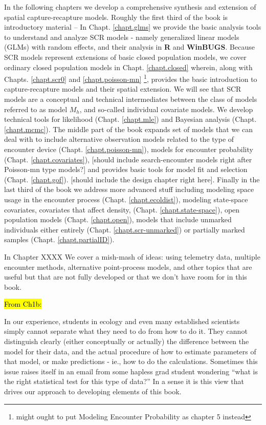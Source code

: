 In the following chapters we develop a comprehensive synthesis and extension of
spatial capture-recapture models.
Roughly the first third of the book is introductory material --
In Chapt. \ref{chapt.glms} we provide the basic analysis tools to understand and
analyze SCR models - namely generalized linear models (GLMs) with random effects, and their
analysis in {\bf R} and {\bf WinBUGS}.  Because SCR models represent extensions of
basic closed population models, we cover ordinary closed population
models in Chapt. \ref{chapt.closed} wherein, along with Chapts. \ref{chapt.scr0} and \ref{chapt.poisson-mn}
\footnote{might ought to put Modeling Encounter Probability
  as chapter 5 instead}, provides the basic introduction
to capture-recapture models and their spatial extension.
We will see that
SCR models are a
conceptual and technical intermediates between the class of models referred to as
model $M_h$, and so-called
individual covariate models.
We develop technical tools for likelihood (Chapt. \ref{chapt.mle})
and Bayesian analysis (Chapt. \ref{chapt.mcmc}).
The middle part of the book expands set of models that we can deal with to include alternative
observation models related to the type of encounter device (Chapt. \ref{chapt.poisson-mn}), models for encounter probability
(Chapt. \ref{chapt.covariates}), [should include search-encounter
models right after Poisson-mn type models?] and provides basic tools
for model fit and selection (Chapt. \ref{chapt.gof}).
[should include the design chapter right here].
Finally in the last third of the book we address more advanced stuff including modeling
space usage in the encounter process (Chapt. \ref{chapt.ecoldist}), modeling state-space covariates, covariates
that affect density, (Chapt. \ref{chapt.state-space}), open population models (Chapt. \ref{chapt.open}),
models that include unmarked individuals either entirely (Chapt. \ref{chapt.scr-unmarked})
or partially marked samples (Chapt. \ref{chapt.partialID}).

In Chapter XXXX We cover a mish-mash of ideas: using telemetry data, multiple encounter methods, alternative
point-process models, and other topics that are useful but that are not fully developed or that we don't have
room for in this book.





\hl{From Ch1b:}

In our experience, students in ecology and even many established
scientists simply cannot separate what they need to do from how to do
it.  They cannot distinguish clearly (either conceptually or actually)
the difference between the model for their data, and the actual
procedure of how to estimate parameters of that model, or make
predictions - ie., how to do the calculations. Sometimes this issue
raises itself in an email from some hapless grad student wondering
``what is the right statistical test for this type of data?''  In a
sense it is this view that drives our approach to developing elements
of this book.

